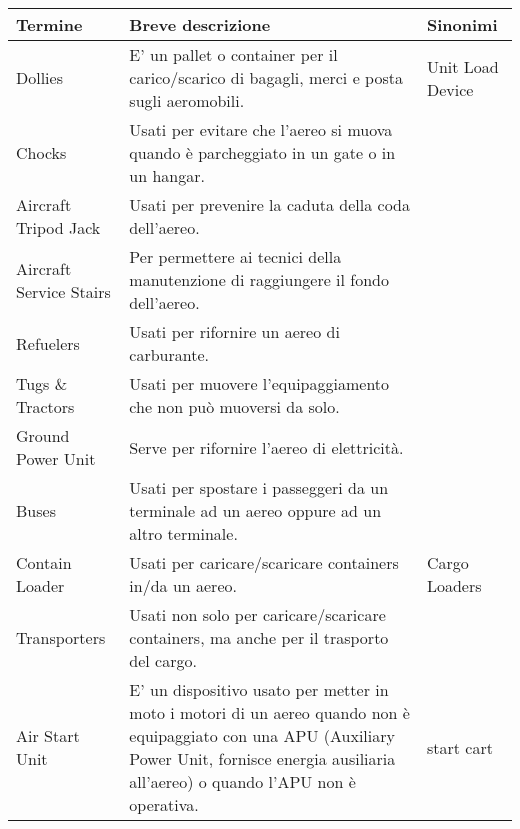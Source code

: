 \begin{table}[htp]
	\centering
	{\small %
		\begin{tabular}{p{}p{}p{}}
			\rowcolor{airforceblue}
			\textbf{\color{white}Termine} & \textbf{\color{white}Breve descrizione} & \textbf{\color{white}Sinonimi} \\
			\hline			
			\textsf{\small Dollies} & \textsf{\small E' un pallet o container per il carico/scarico di bagagli, merci e posta sugli aeromobili.} & \textsf{\small Unit Load Device} \\
			\hline
			\textsf{\small Chocks} & \textsf{\small Usati per evitare che l'aereo si muova quando è parcheggiato in un gate o in un hangar.} & \textsf{\small } \\
			\hline
			\textsf{\small Aircraft Tripod Jack} & \textsf{\small Usati per prevenire la caduta della coda dell'aereo.} & \textsf{\small } \\
			\hline
			\textsf{\small Aircraft Service Stairs} & \textsf{\small Per permettere ai tecnici della manutenzione di raggiungere il fondo dell'aereo.} & \textsf{\small } \\
			\hline
			\textsf{\small Refuelers} & \textsf{\small Usati per rifornire un aereo di carburante.} & \textsf{\small } \\
			\hline
			\textsf{\small Tugs \& Tractors} & \textsf{\small Usati per muovere l'equipaggiamento che non può muoversi da solo.} & \textsf{\small } \\
			\hline
			\textsf{\small Ground Power Unit} & \textsf{\small Serve per rifornire l'aereo di elettricità.} & \textsf{\small } \\
			\hline
			\textsf{\small Buses} & \textsf{\small Usati per spostare i passeggeri da un terminale ad un aereo oppure ad un altro terminale.} & \textsf{\small } \\
			\hline
			\textsf{\small Contain Loader} & \textsf{\small Usati per caricare/scaricare containers in/da un aereo.} & \textsf{\small Cargo Loaders} \\
			\hline
			\textsf{\small Transporters} & \textsf{\small Usati non solo per caricare/scaricare containers, ma anche per il trasporto del cargo.} & \textsf{\small } \\
			\hline
			\textsf{\small Air Start Unit} & \textsf{\small E' un dispositivo usato per metter in moto i motori di un aereo quando non è equipaggiato con una APU (Auxiliary Power Unit, fornisce energia ausiliaria all'aereo) o quando l'APU non è operativa.} & \textsf{\small start cart} \\

\end{tabular}}
\end{table}
